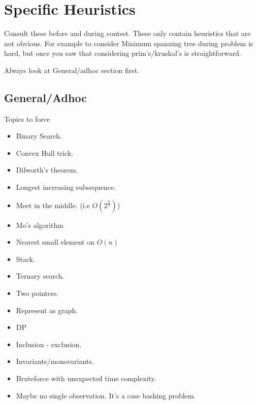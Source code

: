 \documentclass[../Notes.tex]{subfiles}
\begin{document}
\chapter{Specific Heuristics}
Consult these before and during contest. These only contain heuristics that are not obvious. For example to consider Minimum spanning tree during problem is hard, but once you saw that considering prim's/kruskal's is straightforward.

Always look at General/adhoc section first.

\section{General/Adhoc}
Topics to force
\begin{itemize}
	\item Binary Search.
	\item Convex Hull trick.
	\item Dilworth's theorem.
	\item Longest increasing subsequence.
	\item Meet in the middle. (i.e $O(2^{\frac{n}{2}})$)
	\item Mo's algorithm
	\item Nearest small element on $O(n)$
	\item Stack.
	\item Ternary search.
	\item Two pointers.
	\item Represent as graph.
	\item DP
	\item Inclusion - exclusion.
	\item Invariants/monovariants.
	\item Bruteforce with unexpected time complexity.
	\item Maybe no single observation. It's a case bashing problem.
\end{itemize}
\end{document}

